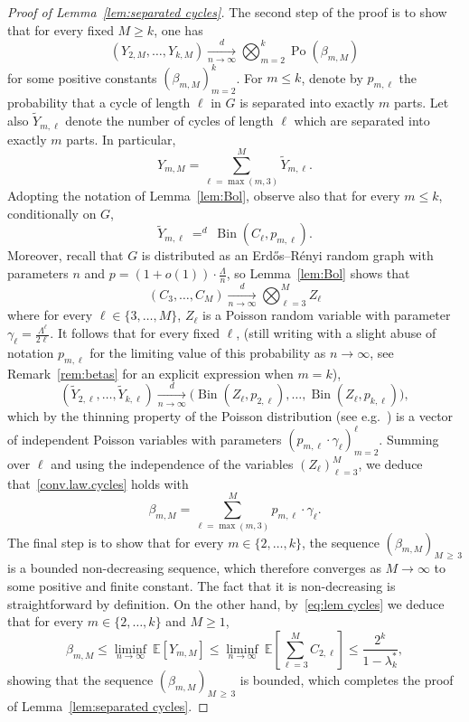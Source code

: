\documentclass[AHL,Unicode,longabstracts,published]{cedram}
\newcommand{\bbE}{\mathbb{E}}
\DeclareMathOperator{\rPo}{Po}
\DeclareMathOperator{\rBin}{Bin}
\begin{document}
\begin{proof}[Proof of Lemma~\ref{lem:separated cycles}]
The second step of the proof is to show that for every fixed $M\ge k$, one has
\begin{equation}\label{conv.law.cycles}
(Y_{2,M}, \ldots, Y_{k,M})\xrightarrow[n\to \infty]{d} \bigotimes_{m=2}^k \rPo(\beta_{m,M})
\end{equation}
for some positive constants $(\beta_{m,M})_{m=2}^k$. For $m \le k$, denote by $p_{m,\ell}$ the probability that a cycle of length $\ell$ in $G$ is separated into exactly $m$ parts. Let also $\widetilde Y_{m,\ell}$ denote the number of cycles of length $\ell$ which are separated into exactly $m$ parts. In particular,
\[
Y_{m,M} = \sum_{\ell = \max(m,3)}^M \widetilde Y_{m,\ell}.
\]
Adopting the notation of Lemma~\ref{lem:Bol}, observe also that for every $m\le k$, conditionally on $G$,
\[
\widetilde Y_{m,\ell}\ \mathop{=}^d\ \rBin(C_\ell,p_{m,\ell}).
\]
Moreover, recall that $G$ is distributed as an Erd\H{o}s--Rényi random graph with parameters $n$ and $p=(1+o(1))\cdot\tfrac{\Lambda}{n}$, so Lemma~\ref{lem:Bol} shows that
\[
(C_3,\dots,C_M) \xrightarrow[n\to \infty]{d} \bigotimes_{\ell = 3}^M Z_\ell
\]
where for every $\ell\in \{3,\dots,M\}$, $Z_\ell$ is a Poisson random variable with parameter $\gamma_\ell=\tfrac{\Lambda^\ell}{2\ell}$. It follows that for every fixed $\ell$, (still writing with a slight abuse of notation $p_{m,\ell}$ for the limiting value of this probability as $n\to \infty$, see Remark~\ref{rem:betas} for an explicit expression when $m=k$),
\[
\left(\widetilde Y_{2,\ell}, \dots, \widetilde Y_{k,\ell}\right)\xrightarrow[n\to \infty]{d}
\Big(\rBin(Z_\ell,p_{2,\ell}), \dots,\rBin(Z_\ell,p_{k,\ell})\Big),
\]
which by the thinning property of the Poisson distribution (see e.g.~\cite[Section~5.3]{LP17}) is a vector of independent Poisson variables with parameters $(p_{m,\ell}\cdot \gamma_\ell)_{m=2}^\ell$. Summing over $\ell$ and using the independence of the variables $(Z_\ell)_{\ell= 3}^M$, we deduce that~\eqref{conv.law.cycles} holds with
\[
\beta_{m,M} = \sum_{\ell = \max(m,3)}^M p_{m,\ell}\cdot \gamma_\ell.
\]
The final step is to show that for every $m\in \{2,\dots,k\}$, the sequence $(\beta_{m,M})_{M\,\ge\,3}$ is a bounded non-decreasing sequence, which therefore converges as $M\to \infty$ to some positive and finite constant. The fact that it is non-decreasing is straightforward by definition. On the other hand, by~\eqref{eq:lem cycles} we deduce that for every $m\in \{2,\dots,k\}$ and $M\ge 1$,
\[
\beta_{m,M} \le \liminf_{n\to \infty}\ \bbE[Y_{m,M}]\le \liminf_{n\to \infty} \ \bbE\left[\sum_{\ell=3}^{M} C_{2,\ell}\right]\le \frac{2^k}{1-\lambda_k^*},
\]
showing that the sequence $(\beta_{m,M})_{M\,\ge\,3}$ is bounded, which completes the proof of Lemma~\ref{lem:separated cycles}.
\end{proof}
\end{document}
